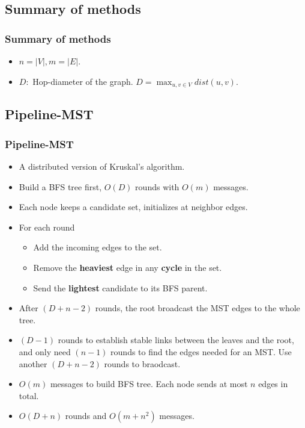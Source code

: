 \subsection{Summary of methods}
\begin{frame}
\frametitle{Summary of methods}

\begin{itemize}
    \item $n=|V|, m=|E|.$
    \item $D:$ Hop-diameter of the graph. $D=\max_{u,v \in V} dist(u, v)$.
\end{itemize}

\end{frame}

\subsection{Pipeline-MST}
\begin{frame}
\frametitle{Pipeline-MST}
\begin{itemize}
    \item A distributed version of Kruskal's algorithm.
    \item Build a BFS tree first, $O(D)$ rounds with $O(m)$ messages.
    \item Each node keeps a candidate set, initializes at neighbor edges.
    \item For each round
    \begin{itemize}
        \item Add the incoming edges to the set.
        \item Remove the \textbf{heaviest} edge in any \textbf{cycle} in the set.
        \item Send the \textbf{lightest} candidate to its BFS parent.
    \end{itemize}
    \item After $(D+n-2)$ rounds, the root broadcast the MST edges to the whole tree.
    \item $(D-1)$ rounds to establish stable links between the leaves and the root, and only need $(n-1)$ rounds to find the edges needed for an MST. Use another $(D+n-2)$ rounds to braodcast.
    \item $O(m)$ messages to build BFS tree. Each node sends at most $n$ edges in total.
    \item $O(D+n)$ rounds and $O(m + n^2)$ messages.
\end{itemize}
\end{frame}


